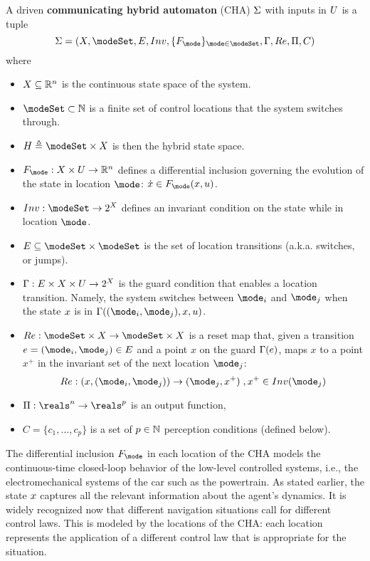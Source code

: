 \begin{defn}
	\label{def:CHA}
A driven \textbf{communicating hybrid automaton} (CHA) $\Sigma$ with inputs in $U$ 
is a tuple 
\[\Sys = (\stSet, \modeSet, E, Inv, \{F_\mode\}_{\mode \in \modeSet}, \guard, \reset, \funcOut, C)\]
where 
\begin{itemize}
	\item $X \subseteq \mathbb{R}^n$ is the continuous state space of the system.
	\item $\modeSet \subset \Ne$ is a finite set of control locations that the system switches through. 
	\item $\hsSet \triangleq \modeSet \times \stSet$ is then the hybrid state space.
	\item $F_\mode : \stSet \times \inpSet \rightarrow \Re^n$ defines a differential inclusion governing the evolution of the state in location $\mode$: $\dot{\stPt} \in F_\mode(\stPt,u)$. 
	\item $Inv : \modeSet \rightarrow 2^\stSet$ defines an invariant condition on the state while in location $\mode$.
	\item $E \subseteq \modeSet \times \modeSet$ is the set of location transitions (a.k.a. switches, or jumps).
	\item $\Gamma : E \times X \times U \rightarrow 2^X$ is the guard condition that enables a location transition. 
	Namely, the system switches between $\mode _i$ and $\mode _j$ when the state $x$ is in $\guard((\mode_i,\mode _j),x,u)$.
	\item $\reset : \modeSet \times \stSet \rightarrow \modeSet \times \stSet $ is a reset map that, given a transition $e = (\mode _i,\mode _j) \in E$ and a point $x$ on the guard $\Gamma(e)$, maps $x$ to a point $x^+$ in the invariant set of the next location $\mode_j$:
	\[\reset: (x,(\mode _i,\mode _j)) \rightarrow (\mode_j,x^+)\;, x^+ \in Inv(\mode_j)\] 
	\item $\funcOut: \reals^n \rightarrow \reals^p$ is an output function,
	\item $C = \{c_1,\ldots,c_p\}$ is a set of $p \in \mathbb{N}$ perception conditions (defined below).	
\end{itemize}
\end{defn}

The differential inclusion $F_\mode$ in each location of the CHA models the continuous-time closed-loop behavior of the low-level controlled systems, i.e., the electromechanical systems of the car such as the powertrain.
As stated earlier, the state $x$ captures all the relevant information about the agent's dynamics. 
It is widely recognized now that different navigation situations call for different control laws.
This is modeled by the locations of the CHA: each location represents the application of a different control law that is appropriate for the situation.

